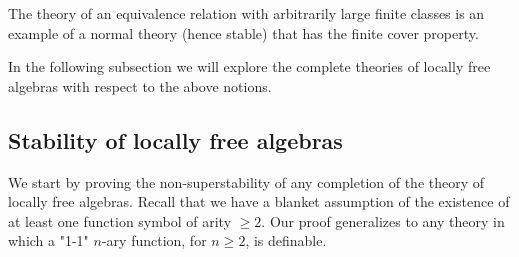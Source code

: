 \documentclass[a4paper,11pt]{article}
\newcommand{\cspace}{~}
\newcommand{\todog}[1]{\todo[inline]{#1}}
\begin{document}
The theory of an equivalence relation with arbitrarily large finite classes is an example of a normal theory (hence stable) that has the finite cover property.  

In the following subsection we will explore the complete theories of locally free algebras with respect to the above notions. 

\subsection{Stability of locally free algebras}

We start by proving the non-superstability of any completion of the theory of locally free algebras. Recall that we have a blanket assumption of the existence of at least one function symbol of arity $\geq 2$. Our proof generalizes to any theory in which a "1-1" $n$-ary function, for $n\geq 2$, is definable.



\end{document}

